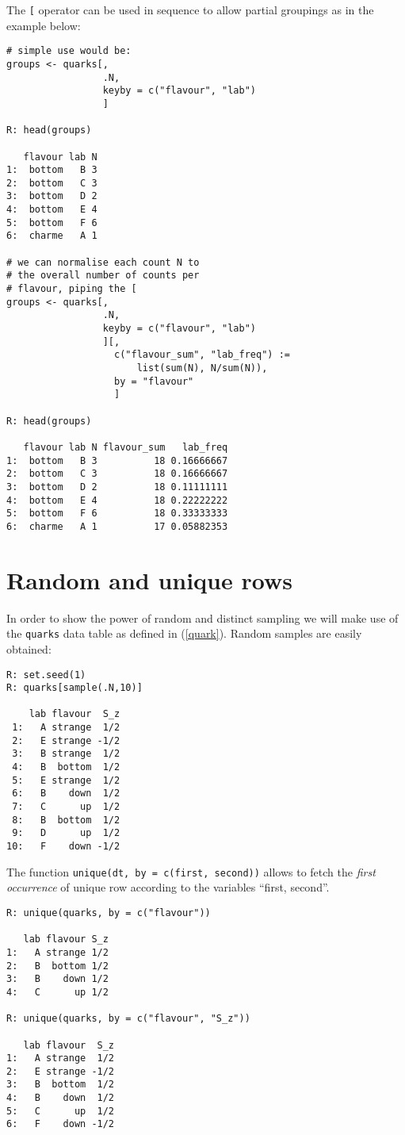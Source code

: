 The \texttt{[} operator can be used in sequence to allow 
partial groupings as in the example below:
\begin{verbatim}
# simple use would be:
groups <- quarks[,
                 .N,
                 keyby = c("flavour", "lab")
                 ]
                 
R: head(groups)

   flavour lab N
1:  bottom   B 3
2:  bottom   C 3
3:  bottom   D 2
4:  bottom   E 4
5:  bottom   F 6
6:  charme   A 1

# we can normalise each count N to
# the overall number of counts per 
# flavour, piping the [
groups <- quarks[,
                 .N,
                 keyby = c("flavour", "lab")
                 ][,
                   c("flavour_sum", "lab_freq") := 
                       list(sum(N), N/sum(N)),
                   by = "flavour"
                   ]

R: head(groups)

   flavour lab N flavour_sum   lab_freq
1:  bottom   B 3          18 0.16666667
2:  bottom   C 3          18 0.16666667
3:  bottom   D 2          18 0.11111111
4:  bottom   E 4          18 0.22222222
5:  bottom   F 6          18 0.33333333
6:  charme   A 1          17 0.05882353                  
\end{verbatim}



\section{Random and unique rows}
In order to show the power of random and distinct
sampling we will make use of the \texttt{quarks} data table as 
defined in (\ref{quark}). Random samples are easily obtained:
\begin{verbatim}
R: set.seed(1)
R: quarks[sample(.N,10)]

    lab flavour  S_z
 1:   A strange  1/2
 2:   E strange -1/2
 3:   B strange  1/2
 4:   B  bottom  1/2
 5:   E strange  1/2
 6:   B    down  1/2
 7:   C      up  1/2
 8:   B  bottom  1/2
 9:   D      up  1/2
10:   F    down -1/2
\end{verbatim}
The function \texttt{unique(dt, by = c(first, second))}
allows to fetch the \emph{first occurrence} of unique
row according to the variables ``first, second''.
\begin{verbatim}
R: unique(quarks, by = c("flavour"))

   lab flavour S_z
1:   A strange 1/2
2:   B  bottom 1/2
3:   B    down 1/2
4:   C      up 1/2

R: unique(quarks, by = c("flavour", "S_z"))

   lab flavour  S_z
1:   A strange  1/2
2:   E strange -1/2
3:   B  bottom  1/2
4:   B    down  1/2
5:   C      up  1/2
6:   F    down -1/2
\end{verbatim}

